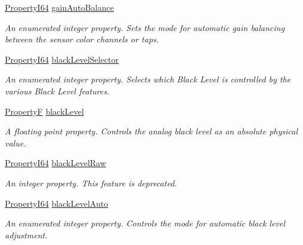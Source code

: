 \begin{DoxyCompactItemize}
\hyperlink{group___common_interface_ga81749b2696755513663492664a18a893}{Property\+I64} \hyperlink{classmv_i_m_p_a_c_t_1_1acquire_1_1_gen_i_cam_1_1_analog_control_a6b94af874a57212af1c8fdc1751c2a28}{gain\+Auto\+Balance}
\begin{DoxyCompactList}\small\item\em An enumerated integer property. Sets the mode for automatic gain balancing between the sensor color channels or taps. \end{DoxyCompactList}\item 
\hyperlink{group___common_interface_ga81749b2696755513663492664a18a893}{Property\+I64} \hyperlink{classmv_i_m_p_a_c_t_1_1acquire_1_1_gen_i_cam_1_1_analog_control_aed154d5698e9b118b98b73ec4779836b}{black\+Level\+Selector}
\begin{DoxyCompactList}\small\item\em An enumerated integer property. Selects which Black Level is controlled by the various Black Level features. \end{DoxyCompactList}\item 
\hyperlink{group___common_interface_gaf54865fe5a3d5cfd15f9a111b40d09f9}{Property\+F} \hyperlink{classmv_i_m_p_a_c_t_1_1acquire_1_1_gen_i_cam_1_1_analog_control_a09233a9934ef09d6c77f3ff339af59c0}{black\+Level}
\begin{DoxyCompactList}\small\item\em A floating point property. Controls the analog black level as an absolute physical value. \end{DoxyCompactList}\item 
\hyperlink{group___common_interface_ga81749b2696755513663492664a18a893}{Property\+I64} \hyperlink{classmv_i_m_p_a_c_t_1_1acquire_1_1_gen_i_cam_1_1_analog_control_a35d90d2341a108de88e058d69a1ad1d1}{black\+Level\+Raw}
\begin{DoxyCompactList}\small\item\em An integer property. This feature is deprecated. \end{DoxyCompactList}\item 
\hyperlink{group___common_interface_ga81749b2696755513663492664a18a893}{Property\+I64} \hyperlink{classmv_i_m_p_a_c_t_1_1acquire_1_1_gen_i_cam_1_1_analog_control_a57b9f08ca4f27baa4ac48653c252a34f}{black\+Level\+Auto}
\begin{DoxyCompactList}\small\item\em An enumerated integer property. Controls the mode for automatic black level adjustment. \end{DoxyCompactList}\item 

\end{DoxyCompactItemize}
